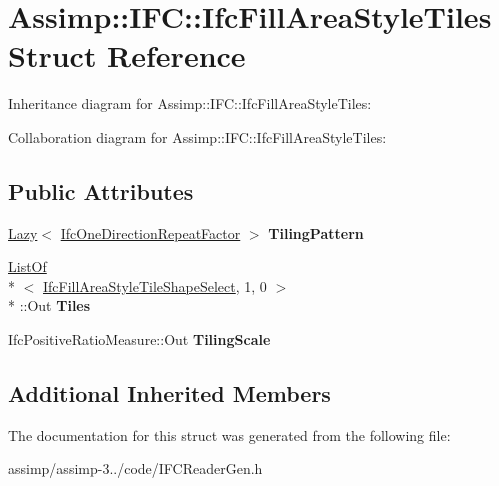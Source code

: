 \hypertarget{struct_assimp_1_1_i_f_c_1_1_ifc_fill_area_style_tiles}{\section{Assimp\+:\+:I\+F\+C\+:\+:Ifc\+Fill\+Area\+Style\+Tiles Struct Reference}
\label{struct_assimp_1_1_i_f_c_1_1_ifc_fill_area_style_tiles}
}


Inheritance diagram for Assimp\+:\+:I\+F\+C\+:\+:Ifc\+Fill\+Area\+Style\+Tiles\+:


Collaboration diagram for Assimp\+:\+:I\+F\+C\+:\+:Ifc\+Fill\+Area\+Style\+Tiles\+:
\subsection*{Public Attributes}
\begin{DoxyCompactItemize}
\item 
\hypertarget{struct_assimp_1_1_i_f_c_1_1_ifc_fill_area_style_tiles_acbf8dce38d3e301b338c747127f4b611}{\hyperlink{struct_assimp_1_1_s_t_e_p_1_1_lazy}{Lazy}$<$ \hyperlink{struct_assimp_1_1_i_f_c_1_1_ifc_one_direction_repeat_factor}{Ifc\+One\+Direction\+Repeat\+Factor} $>$ {\bfseries Tiling\+Pattern}}\label{struct_assimp_1_1_i_f_c_1_1_ifc_fill_area_style_tiles_acbf8dce38d3e301b338c747127f4b611}

\item 
\hypertarget{struct_assimp_1_1_i_f_c_1_1_ifc_fill_area_style_tiles_a25e9ac316c4a3e34dfc347856af858ba}{\hyperlink{struct_assimp_1_1_s_t_e_p_1_1_list_of}{List\+Of}\\*
$<$ \hyperlink{class_assimp_1_1_s_t_e_p_1_1_e_x_p_r_e_s_s_1_1_data_type}{Ifc\+Fill\+Area\+Style\+Tile\+Shape\+Select}, 1, 0 $>$\\*
\+::Out {\bfseries Tiles}}\label{struct_assimp_1_1_i_f_c_1_1_ifc_fill_area_style_tiles_a25e9ac316c4a3e34dfc347856af858ba}

\item 
\hypertarget{struct_assimp_1_1_i_f_c_1_1_ifc_fill_area_style_tiles_a7d4f81d9380395581c68c306f71c57a2}{Ifc\+Positive\+Ratio\+Measure\+::\+Out {\bfseries Tiling\+Scale}}\label{struct_assimp_1_1_i_f_c_1_1_ifc_fill_area_style_tiles_a7d4f81d9380395581c68c306f71c57a2}

\end{DoxyCompactItemize}
\subsection*{Additional Inherited Members}


The documentation for this struct was generated from the following file\+:\begin{DoxyCompactItemize}
\item 
assimp/assimp-\/3../code/I\+F\+C\+Reader\+Gen.\+h\end{DoxyCompactItemize}
